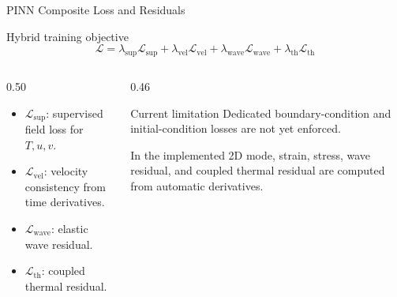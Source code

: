 \documentclass[aspectratio=169,10pt]{beamer}
\begin{document}
\begin{frame}{PINN Composite Loss and Residuals}
  \begin{block}{Hybrid training objective}
    \[
      \mathcal{L}
      =
      \lambda_{\mathrm{sup}}\mathcal{L}_{\mathrm{sup}}
      +
      \lambda_{\mathrm{vel}}\mathcal{L}_{\mathrm{vel}}
      +
      \lambda_{\mathrm{wave}}\mathcal{L}_{\mathrm{wave}}
      +
      \lambda_{\mathrm{th}}\mathcal{L}_{\mathrm{th}}
    \]
  \end{block}
  \begin{columns}[T]
    \begin{column}{0.50\textwidth}
      \footnotesize
      \begin{itemize}
        \item $\mathcal{L}_{\mathrm{sup}}$: supervised field loss for
              $T,u,v$.
        \item $\mathcal{L}_{\mathrm{vel}}$: velocity consistency from time
              derivatives.
        \item $\mathcal{L}_{\mathrm{wave}}$: elastic wave residual.
        \item $\mathcal{L}_{\mathrm{th}}$: coupled thermal residual.
      \end{itemize}
    \end{column}
    \begin{column}{0.46\textwidth}
      \begin{alertblock}{Current limitation}
        \footnotesize
        Dedicated boundary-condition and initial-condition losses are not yet
        enforced.
      \end{alertblock}
      \scriptsize
      In the implemented 2D mode, strain, stress, wave residual, and coupled
      thermal residual are computed from automatic derivatives.
    \end{column}
  \end{columns}
\end{frame}
\end{document}
